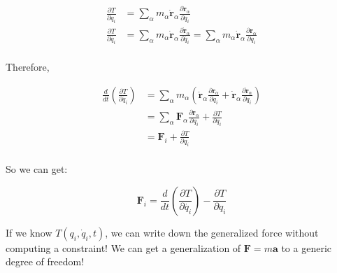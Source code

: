 \begin{align*}
    \frac {\partial T}{\partial q_i} &= \sum_\alpha m_\alpha \dot{\mathbf{r}}_\alpha \frac{\partial \dot{\mathbf{r}}_\alpha}{\partial q_i} \\
    \frac {\partial T}{\partial \dot{q_i}} &= \sum_\alpha m_\alpha \dot{\mathbf{r}}_\alpha \frac{\partial \dot{\mathbf{r}}_\alpha}{\partial \dot{q_i}} = \sum_\alpha m_\alpha \dot{\mathbf{r}}_\alpha \frac{\partial \mathbf{r}_\alpha}{\partial q_i}\\
\end{align*}

Therefore, 

\begin{align*}
    \frac{d}{dt} (\frac {\partial T}{\partial \dot{q_i}}) &= \sum_\alpha m_\alpha \left(\ddot{\mathbf{r}}_\alpha \frac{\partial \mathbf{r}_\alpha}{\partial q_i} + \dot{\mathbf{r}}_\alpha \frac{\partial \dot{\mathbf{r}}_\alpha}{\partial q_i}\right) \\
    &= \sum_\alpha \mathbf{F}_\alpha \frac{\partial \mathbf{r}_\alpha}{\partial q_i} + \frac{\partial T}{\partial q_i} \\
    &= \mathbf{F}_i + \frac{\partial T}{\partial q_i} \\
\end{align*}

So we can get:

\[
    \mathbf{F}_i = \frac{d}{dt} (\frac {\partial T}{\partial \dot{q_i}}) - \frac{\partial T}{\partial q_i}
\]

If we know $T(q_i, \dot{q}_i, t)$, we can write down the generalized force without computing a constraint! We can get a generalization of $\mathbf{F}=m\mathbf{a}$ to a generic degree of freedom!